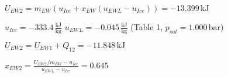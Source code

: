 \( U_{EW2} = m_{EW} (u_{Ice} + x_{EW} (u_{EWL} - u_{Ice})) = -13.399 \, \text{kJ} \)  

\( u_{Ice} = -333.4 \, \frac{\text{kJ}}{\text{kg}} \)  
\( u_{EWL} = -0.045 \, \frac{\text{kJ}}{\text{kg}} \)  
(Table 1, \( p_{sat} = 1.000 \, \text{bar} \))  

\( U_{EW2} = U_{EW1} + Q_{12} = -11.848 \, \text{kJ} \)  

\( x_{EW2} = \frac{U_{EW2}/m_{EW} - u_{Ice}}{u_{EWL} - u_{Ice}} = 0.645 \)